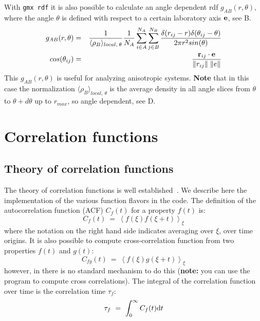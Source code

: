 With {\tt gmx rdf} it is also possible to calculate an angle dependent rdf
$g_{AB}(r,\theta)$, where the angle $\theta$ is defined with respect to a 
certain laboratory axis ${\bf e}$, see B.
\begin{eqnarray} 
g_{AB}(r,\theta) &=& {1 \over \langle\rho_B\rangle_{local,\:\theta }} {1 \over N_A} \sum_{i \in A}^{N_A} \sum_{j \in B}^{N_B} {\delta( r_{ij} - r ) \delta(\theta_{ij} -\theta) \over 2 \pi r^2 sin(\theta)}\\
cos(\theta_{ij}) &=& {{\bf r}_{ij} \cdot {\bf e} \over \|r_{ij}\| \;\| e\| }
\end{eqnarray}
This $g_{AB}(r,\theta)$ is useful for analyzing anisotropic systems. 
{\bf Note} that in this case the normalization $\langle\rho_B\rangle_{local,\:\theta}$ is 
the average density in all angle slices from $\theta$ to $\theta + d\theta$ 
up to $r_{max}$, so angle dependent, see D.



\section{Correlation functions}
\label{sec:corr}

\subsection{Theory of correlation functions}
The theory of correlation functions is well established~\cite{Allen87}.
We describe here the implementation of the various 
 function flavors in the {\gromacs} code.
The definition of the autocorrelation function 
(ACF)
$C_f(t)$ for a property $f(t)$ is:
\begin{equation}
C_f(t)  ~=~     \left\langle f(\xi) f(\xi+t)\right\rangle_{\xi}
\label{eqn:corr}
\end{equation}
where the notation on the right hand side indicates averaging over $\xi$, {\ie} over
time origins.
It is also possible to compute cross-correlation function from two properties
$f(t)$ and $g(t)$:
\begin{equation}
C_{fg}(t) ~=~   \left\langle f(\xi) g(\xi+t)\right\rangle_{\xi}
\end{equation}
however, in {\gromacs} there is no standard mechanism to do this
({\bf note:} you can use the {\tt {}} program to compute cross correlations).
The integral of the correlation function over time is the 
correlation time $\tau_f$:
\begin{equation}
\tau_f  ~=~     \int_0^{\infty} C_f(t) {\rm d} t
\label{eqn:corrtime}
\end{equation}

